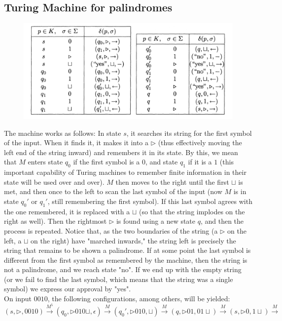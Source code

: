 \documentclass[12pt]{article}
\newcommand{\tr}{\triangleright}
\begin{document}
\subsection{Turing Machine for palindromes}
\begin{figure}[h]
\centering
\includegraphics[width=1\textwidth]{img/TM_palindrom.png}
\end{figure}
The machine works as follows: In state $s$, it searches its string for the first symbol of the input. When it finds it, it makes it into a $\tr$ (thus effectively moving the left end of the string inward) and remembers it in its state. By this, we mean that $M$ enters state $q_0$ if the first symbol is a $0$, and state $q_1$ if it is a $1$ (this important capability of Turing machines to remember finite information in their state will be used over and over). $M$ then moves to the right until the first $\sqcup$ is met, and then once to the left to scan the last symbol of the input (now $M$ is in state $q_0'$ or $q_1'$, still remembering the first symbol). If this last symbol agrees with the one remembered, it is replaced with a $\sqcup$ (so that the string implodes on the right as well). Then the rightmost $\tr$ is found using a new state $q$, and then the process is repeated. Notice that, as the two boundaries of the string (a $\tr$ on the left, a $\sqcup$ on the right) have "marched inwards," the string left is precisely the string that remains to be shown a palindrome. If at some point the last symbol is different from the first symbol as remembered by the machine, then the string is not a palindrome, and we reach state "no". If we end up with the empty string (or we fail to find the last symbol, which means that the string was a single symbol) we express our approval by "yes".
\\
On input $0010$, the following configurations, among others, will be yielded:
$$
(s, \tr, 0010) \xrightarrow{M^5} (q_0, \tr 010 \sqcup, \epsilon) \xrightarrow{M} (q_0', \tr 010, \sqcup) \xrightarrow{M} (q, \tr 01, 01 \sqcup) \xrightarrow{M} (s, \tr 0, 1 \sqcup) \xrightarrow{M}$$
\end{document}
